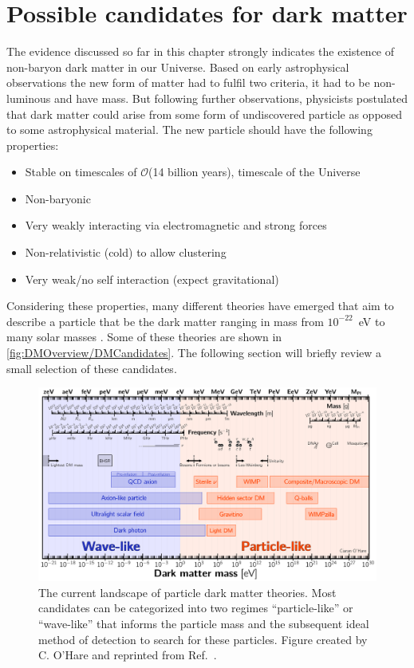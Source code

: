 \section{Possible candidates for dark matter}\label{sec:DMOverview/Candidates4DM}
The evidence discussed so far in this chapter strongly indicates the existence of non-baryon dark matter in our Universe. Based on early astrophysical observations the new form of matter had to fulfil two criteria, it had to be non-luminous and have mass. But following further observations, physicists postulated that dark matter could arise from some form of undiscovered particle as opposed to some astrophysical material. The new particle should have the following properties:
\begin{itemize}
    \item Stable on timescales of $\mathcal{O}$(14 billion years), timescale of the Universe
    \item Non-baryonic
    \item Very weakly interacting via electromagnetic and strong forces
    \item Non-relativistic (cold) to allow clustering
    \item Very weak/no self interaction (expect gravitational)
\end{itemize}
Considering these properties, many different theories have emerged that aim to describe a particle that be the dark matter ranging in mass from $10^{-22}$~eV to many solar masses \cite{DMPrimer}. Some of these theories are shown in \autoref{fig:DMOverview/DMCandidates}. The following section will briefly review a small selection of these candidates.

\begin{figure}[h!]
    \centering
    \includegraphics[width=\linewidth]{figures/DMOverview/Dark_matter_candidates.pdf}
    \caption[The current landscape of particle dark matter theories.]{The current landscape of particle dark matter theories. Most candidates can be categorized into two regimes ``particle-like'' or  ``wave-like'' that informs the particle mass and the subsequent ideal method of detection to search for these particles. Figure created by C. O'Hare and reprinted from Ref.~\cite{mwilliams:thesis}.}
    \label{fig:DMOverview/DMCandidates}
\end{figure}

